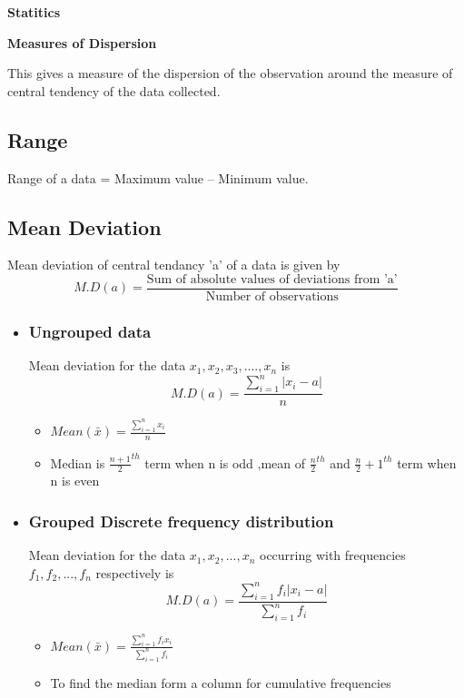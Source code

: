 \documentclass[12pt]{article}
\newcommand{\summation}[2]{\sum\limits^{#1}_{#2}}
\begin{document}
\begin{center}
    {\LARGE \textbf{Statitics} }
\end{center}

\begin{multicols}{2}

\textbf{\Large Measures of Dispersion}

This gives a measure of the dispersion of the observation around the measure of central tendency of the data collected.

\subsection*{Range}
Range of a data = Maximum value – Minimum value.

\subsection*{Mean Deviation}
Mean deviation of central tendancy 'a' of a data is given by 
$$M.D (a) = \frac{\text{Sum of absolute values of deviations from 'a'}}{\text{Number of observations}}$$

\begin{itemize}
    \item \subsubsection*{Ungrouped data} Mean deviation for the data  $x_1, x_2, x_3, ...., x_n$ is  
    $$M.D(a)=\frac{ \summation{n}{i=1} |x_i -a| }{n}$$
    \begin{itemize}
        \item $Mean(\bar{x}) =\frac{\summation{n}{i=1}x_i}{n}$
        \item Median is $\frac{n+1}{2} ^{th}$ term  when n is odd ,mean of $\frac{n}{2} ^{th}$ and $\frac{n}{2}+1 ^{th}$ term when n is even
    \end{itemize}

    \item \subsubsection*{Grouped Discrete frequency distribution } Mean deviation for the data    $x_1, x_2, ..., x_n$ occurring with frequencies $f_1, f_2 , ..., f_n$ respectively is 
    $$ M.D(a)=\frac{ \summation{n}{i=1} f_i|x_i -a| }{ \summation{n}{i=1}f_i}$$

    \begin{itemize}
        \item $Mean(\bar{x}) =\frac{\summation{n}{i=1}f_i x_i}{\summation{n}{i=1}f_i}$
        \item To find the median form a column for cumulative frequencies
    \end{itemize}


\end{itemize}
\end{multicols}
\end{document}

